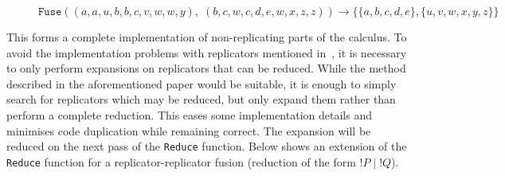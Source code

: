 \begin{examples}
\begin{figure}[H]
                \caption*{$\texttt{Fuse}((a, a, u, b, b, c, v, w, w, y), \; (b, c, w, c, d, e, w, x, z, z)) \rightarrow \{\{a, b, c, d, e\}, \{u, v, w, x, y, z\}\}$}
            \end{figure}
        \end{examples}

        This forms a complete implementation of non-replicating parts of the calculus.
        To avoid the implementation problems with replicators mentioned in~\cite{solo-diagrams}, it is necessary to only perform expansions on replicators that can be reduced.
        While the method described in the aforementioned paper would be suitable, it is enough to simply search for replicators which may be reduced, but only expand them rather than perform a complete reduction.
        This eases some implementation details and minimises code duplication while remaining correct.
        The expansion will be reduced on the next pass of the \texttt{Reduce} function.
        Below shows an extension of the \texttt{Reduce} function for a replicator-replicator fusion (reduction of the form $!P \;|\; !Q$).

